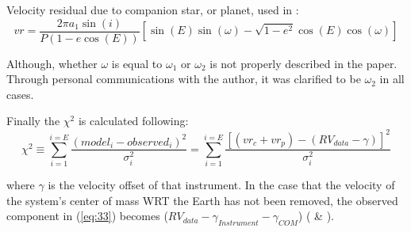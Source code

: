 \documentclass[12pt,preprint]{aastex}
\begin{document}
Velocity residual due to companion star, or planet, used in \citet{Shulze-Hartung}:
\begin{equation}\label{eq:32}
vr = \frac{2\pi a_1 \sin(i)}{P(1-e\cos(E))}[\sin(E)\sin(\omega)-\sqrt{1-e^2}\cos(E)\cos(\omega)]
\end{equation}


Although, whether $\omega$ is equal to $\omega_1$ or $\omega_2$ is not properly described in the paper.  Through personal communications with the author, it was clarified to be $\omega_2$ in all cases.  %

Finally the ${\chi}^{2} $ is calculated following:
\begin{equation}\label{eq:33}
{\chi}^{2} \equiv  \sum_{i=1}^{i=E} \frac{(model_i - observed_i)^{2}}{\sigma^{2}_i} = \sum_{i=1}^{i=E} \frac{[(vr_c+vr_p) - (RV_{data}-\gamma)]^{2}}{\sigma^{2}_i}
\end{equation}

where $\gamma $ is the velocity offset of that instrument.  In the case that the velocity of the system's center of mass WRT the Earth has not been removed, the observed component in (\ref{eq:33}) becomes ($RV_{data}-\gamma_{Instrument}-\gamma_{COM}$) (\citet{Paddock} \& \citet{Shulze-Hartung}).




\pagebreak

\clearpage
\end{document}
